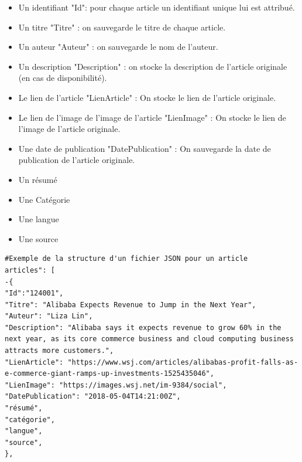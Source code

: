 \begin{itemize}
    
    \item Un identifiant "Id": pour chaque article un identifiant unique lui est attribué.\\
    
    \item Un titre "Titre" : on sauvegarde le titre de chaque article.\\
    
    \item Un auteur "Auteur" : on sauvegarde le nom de l'auteur.\\
    
    \item Un description "Description" : on stocke la description de l'article originale (en cas de disponibilité).\\
    
    \item Le lien de l'article "LienArticle" : On stocke le lien de l'article originale.\\
    
    \item Le lien de l'image de l'image de l'article "LienImage" : On stocke le lien de l'image de l'article originale.\\
    
    \item Une date de publication "DatePublication" : On sauvegarde la date de publication de l'article originale.\\
    
    \item Un résumé
    
    \item Une Catégorie
    
    \item Une langue
    
    \item Une source
    
    
\end{itemize}

\begin{lstlisting}[style=code]
#Exemple de la structure d'un fichier JSON pour un article
articles": [
-{
"Id":"124001",
"Titre": "Alibaba Expects Revenue to Jump in the Next Year",
"Auteur": "Liza Lin",
"Description": "Alibaba says it expects revenue to grow 60% in the next year, as its core commerce business and cloud computing business attracts more customers.",
"LienArticle": "https://www.wsj.com/articles/alibabas-profit-falls-as-e-commerce-giant-ramps-up-investments-1525435046",
"LienImage": "https://images.wsj.net/im-9384/social",
"DatePublication": "2018-05-04T14:21:00Z",
"résumé",
"catégorie",
"langue",
"source",
},

\end{lstlisting}

